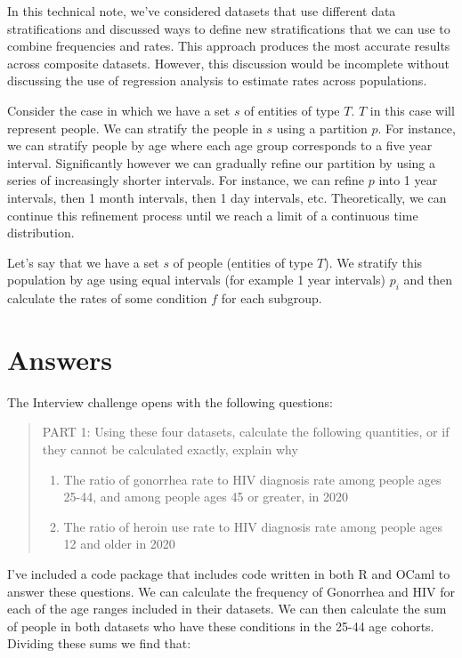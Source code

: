 \documentclass[]{article}
\begin{document}
In this technical note, we've considered datasets that use different
data stratifications and discussed ways to define new stratifications
that we can use to combine frequencies and rates. This approach produces
the most accurate results across composite datasets. However, this
discussion would be incomplete without discussing the use of regression
analysis to estimate rates across populations.

Consider the case in which we have a set \(s\) of entities of type
\(T\). \(T\) in this case will represent people. We can stratify the
people in \(s\) using a partition \(p\). For instance, we can stratify
people by age where each age group corresponds to a five year interval.
Significantly however we can gradually refine our partition by using a
series of increasingly shorter intervals. For instance, we can refine
\(p\) into 1 year intervals, then 1 month intervals, then 1 day
intervals, etc. Theoretically, we can continue this refinement process
until we reach a limit of a continuous time distribution.

Let's say that we have a set \(s\) of people (entities of type \(T\)).
We stratify this population by age using equal intervals (for example 1
year intervals) \(p_i\) and then calculate the rates of some condition
\(f\) for each subgroup.

\hypertarget{answers}{%
\section{Answers}\label{answers}}

The Interview challenge opens with the following questions:

\begin{quote}
PART 1: Using these four datasets, calculate the following quantities,
or if they cannot be calculated exactly, explain why

\begin{enumerate}
\def\labelenumi{\arabic{enumi}.}
\item
  The ratio of gonorrhea rate to HIV diagnosis rate among people ages
  25-44, and among people ages 45 or greater, in 2020
\item
  The ratio of heroin use rate to HIV diagnosis rate among people ages
  12 and older in 2020
\end{enumerate}
\end{quote}

I've included a code package that includes code written in both R and
OCaml to answer these questions. We can calculate the frequency of
Gonorrhea and HIV for each of the age ranges included in their datasets.
We can then calculate the sum of people in both datasets who have these
conditions in the 25-44 age cohorts. Dividing these sums we find that:
\end{document}
